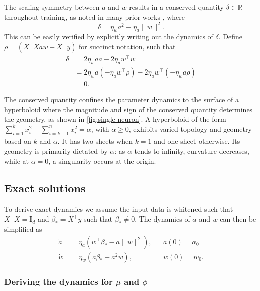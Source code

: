 \documentclass{article}
\theoremstyle{plain}
\theoremstyle{definition}
\theoremstyle{remark}
\begin{document}
The scaling symmetry between $a$ and $w$ results in a conserved quantity $\delta \in \mathbb{R}$ throughout training, as noted in many prior works \cite{saxe2013exact, du2018algorithmic, kunin2020neural}, where
\begin{equation}
    \delta = \eta_wa^2 - \eta_a\|w\|^2.
\end{equation} 
This can be easily verified by explicitly writing out the dynamics of $\delta$.
%
Define $\rho = \left(X^\intercal X aw - X^\intercal y\right)$ for succinct notation, such that 
\begin{align*}
    \dot{\delta} &= 2\eta_w a \dot{a} - 2\eta_a w^\intercal \dot{w}\\
    &= 2\eta_w a \left(-\eta_a w^\intercal \rho\right) - 2\eta_a w^\intercal \left(-\eta_w a \rho\right)\\
    &= 0.
\end{align*}

The conserved quantity confines the parameter dynamics to the surface of a hyperboloid where the magnitude and sign of the conserved quantity determines the geometry, as shown in \cref{fig:single-neuron}.
%
A hyperboloid of the form $\sum_{i=1}^kx_i^2 - \sum_{i=k+1}^n x_i^2 = \alpha$, with $\alpha \ge 0$, exhibits varied topology and geometry based on $k$ and $\alpha$. It has two sheets when $k = 1$ and one sheet otherwise. Its geometry is primarily dictated by $\alpha$: as $\alpha$ tends to infinity, curvature decreases, while at $\alpha = 0$, a singularity occurs at the origin.



\subsection{Exact solutions}
\label{app:single-neuron-exact-solutions}

To derive exact dynamics we assume the input data is whitened such that $X^\intercal X = \mathbf{I}_d$ and $\beta_* = X^\intercal y$ such that $\beta_* \neq 0$.
%
The dynamics of $a$ and $w$ can then be simplified as
\begin{align} 
    \label{eq:single-neuron-a-w-dynamics}
    \dot{a} &= \eta_a \left(w^\intercal \beta_* - a \|w\|^2\right), &&a(0) = a_0\\
    \dot{w} &= \eta_w \left(a\beta_* - a^2w\right), &&w(0) = w_0.
\end{align}


\subsubsection{Deriving the dynamics for \texorpdfstring{$\mu$ and $\phi$}{}}
\label{app:single-neuron-mu-phi}
\end{document}

